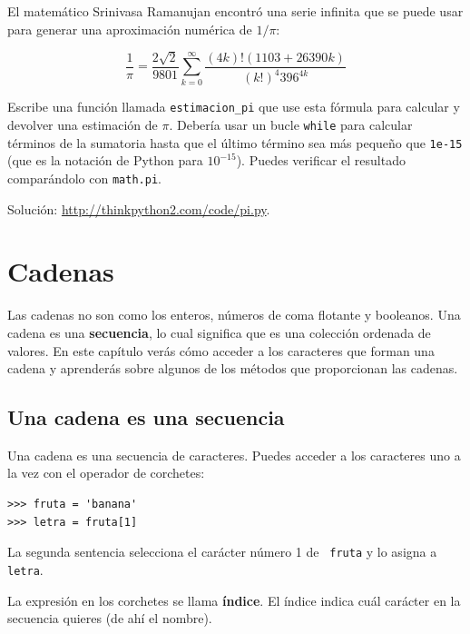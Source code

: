 \documentclass[10pt]{book}
\begin{document}
\begin{exercise}

El matemático Srinivasa Ramanujan encontró una
serie infinita
que se puede usar para generar una aproximación
numérica de $1 / \pi$:

\[ \frac{1}{\pi} = \frac{2\sqrt{2}}{9801}
\sum^\infty_{k=0} \frac{(4k)!(1103+26390k)}{(k!)^4 396^{4k}} \]

Escribe una función llamada \verb"estimacion_pi" que use esta fórmula
para calcular y devolver una estimación de $\pi$.  Debería usar un bucle {\tt while}
para calcular términos de la sumatoria hasta que el último término sea
más pequeño que {\tt 1e-15} (que es la notación de Python para $10^{-15}$).
Puedes verificar el resultado comparándolo con {\tt math.pi}.

Solución: \url{http://thinkpython2.com/code/pi.py}.

\end{exercise}


\chapter{Cadenas}
\label{strings}

Las cadenas no son como los enteros, números de coma flotante y booleanos.  Una cadena
es una {\bf secuencia}, lo cual significa que es
una colección ordenada de valores.  En este capítulo verás
cómo acceder a los caracteres que forman una cadena y
aprenderás sobre algunos de los métodos que proporcionan las cadenas.


\section{Una cadena es una secuencia}

Una cadena es una secuencia de caracteres.
Puedes acceder a los caracteres uno a la vez con el
operador de corchetes:

\begin{verbatim}
>>> fruta = 'banana'
>>> letra = fruta[1]
\end{verbatim}
%
La segunda sentencia selecciona el carácter número 1 de {\tt
fruta} y lo asigna a {\tt letra}.

La expresión en los corchetes se llama {\bf índice}.
El índice indica cuál carácter en la secuencia
quieres (de ahí el nombre).
\end{document}
